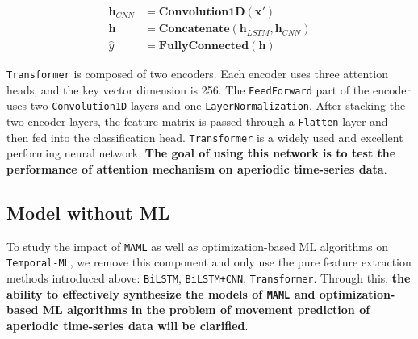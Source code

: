 \begin{align}
    \mathbf{h}_{CNN} &= \mathbf{Convolution1D}\left( \mathbf{x'} \right) \label{eq:feature_cnn}\\
    \mathbf{h} &= \mathbf{Concatenate}\left( \mathbf{h}_{LSTM}, \mathbf{h}_{CNN} \right) \label{eq:concat} \\
    \hat y &= \mathbf{FullyConnected}\left( \mathbf{h} \right) \label{eq:clf_cnn}
\end{align}


\verb|Transformer| is composed of two encoders. Each encoder uses three attention heads, and the key vector dimension is 256. The \verb|FeedForward| part of the encoder uses two \verb|Convolution1D| layers and one \verb|LayerNormalization|. After stacking the two encoder layers, the feature matrix is passed through a \verb|Flatten| layer and then fed into the classification head. \verb|Transformer| is a widely used and excellent performing neural network. \textbf{The goal of using this network is to test the performance of attention mechanism on aperiodic time-series data}.

\subsection{Model without ML}
\label{subsec:ablation_ml}


To study the impact of \verb|MAML| as well as optimization-based ML algorithms on \verb|Temporal-ML|, we remove this component and only use the pure feature extraction methods introduced above: \verb|BiLSTM|, \verb|BiLSTM+CNN|, \verb|Transformer|. Through this, \textbf{the ability to effectively synthesize the models of \Verb|MAML| and optimization-based ML algorithms in the problem of movement prediction of aperiodic time-series data will be clarified}.
